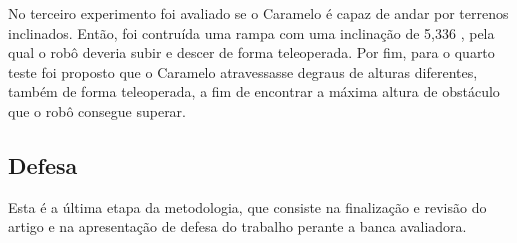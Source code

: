 \documentclass[../main.tex]{subfiles}
\begin{document}
  No terceiro experimento foi avaliado se o Caramelo é capaz de andar por terrenos inclinados. Então, foi contruída uma rampa com uma inclinação de 5,336 \degree, pela qual o robô deveria subir e descer de forma teleoperada. Por fim, para o quarto teste foi proposto que o Caramelo atravessasse degraus de alturas diferentes, também de forma teleoperada, a fim de encontrar a máxima altura de obstáculo que o robô consegue superar.

  \subsection{Defesa}
  Esta é a última etapa da metodologia, que consiste na finalização e revisão do artigo e na apresentação de defesa do trabalho perante a banca avaliadora. 
\end{document}
